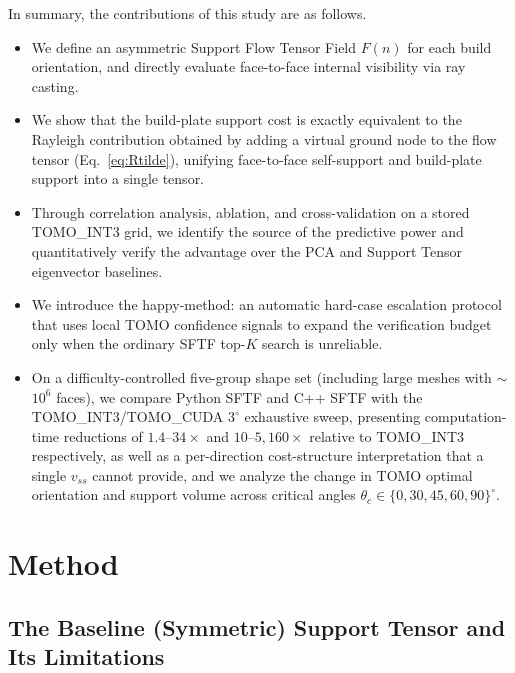 \documentclass[11pt,a4paper]{article}
\begin{document}
In summary, the contributions of this study are as follows.
\begin{itemize}
\item We define an asymmetric Support Flow Tensor Field $F(n)$ for each build orientation, and directly evaluate face-to-face internal visibility via ray casting.
\item We show that the build-plate support cost is exactly equivalent to the Rayleigh contribution obtained by adding a virtual ground node to the flow tensor (Eq.~\eqref{eq:Rtilde}), unifying face-to-face self-support and build-plate support into a single tensor.
\item Through correlation analysis, ablation, and cross-validation on a stored TOMO\_INT3 grid, we identify the source of the predictive power and quantitatively verify the advantage over the PCA and Support Tensor eigenvector baselines.
\item We introduce the happy-method: an automatic hard-case escalation protocol that uses local TOMO confidence signals to expand the verification budget only when the ordinary SFTF top-$K$ search is unreliable.
\item On a difficulty-controlled five-group shape set (including large meshes with $\sim$$10^6$ faces), we compare Python SFTF and C++ SFTF with the TOMO\_INT3/TOMO\_CUDA $3^\circ$ exhaustive sweep, presenting computation-time reductions of $1.4$--$34\times$ and $10$--$5{,}160\times$ relative to TOMO\_INT3 respectively, as well as a per-direction cost-structure interpretation that a single $v_{ss}$ cannot provide, and we analyze the change in TOMO optimal orientation and support volume across critical angles $\theta_c\in\{0,30,45,60,90\}^\circ$.
\end{itemize}

\section{Method}

\subsection{The Baseline (Symmetric) Support Tensor and Its Limitations}
\label{sec:support-tensor-limit}
\end{document}
